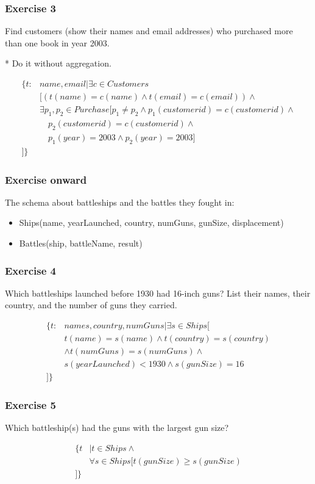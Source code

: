 \documentclass{beamer}
\begin{document}
\begin{frame}[fragile]
\frametitle{Exercise 3}
Find customers (show their names and email addresses) who purchased more than one book in year 2003.

* Do it without aggregation. 

\begin{align*}
\{t: &name, email| \exists c \in Customers \\
&[(t(name)=c(name)\wedge t(email)=c(email)) \wedge \\
& \exists p_1,p_2 \in Purchase [p_1\neq p_2 \wedge p_1(customerid)=c(customerid) \wedge \\ 
&\quad p_2(customerid)=c(customerid) \wedge \\
&\quad p_1(year)=2003 \wedge p_2(year)=2003]\\
]\}
\end{align*}
\end{frame}


\begin{frame}[fragile]
\frametitle{Exercise onward}
The schema about battleships and the battles they fought in:
\begin{itemize}
\item Ships(name, yearLaunched, country, numGuns, gunSize, displacement)
\item Battles(ship, battleName, result)
\end{itemize}
\end{frame}

\begin{frame}[fragile]
\frametitle{Exercise 4}
Which battleships launched before 1930 had 16-inch guns? List their names, their country, and the number of guns they carried.

\begin{align*}
\{t:& names, country, numGuns|\exists s\in Ships[ \\
& t(name)=s(name) \wedge t(country)=s(country) \\ 
& \wedge  t(numGuns)=s(numGuns)\wedge \\
&s(yearLaunched)<1930 \wedge s(gunSize)=16\\
]\}
\end{align*}
\end{frame}


\begin{frame}[fragile]
\frametitle{Exercise 5}
Which battleship(s) had the guns with the largest gun size?

\begin{align*}
\{t&| t\in Ships \wedge \\ 
&\forall s\in Ships [t(gunSize)\geq s(gunSize)\\
]\}
\end{align*}
\end{frame}
\end{document}
